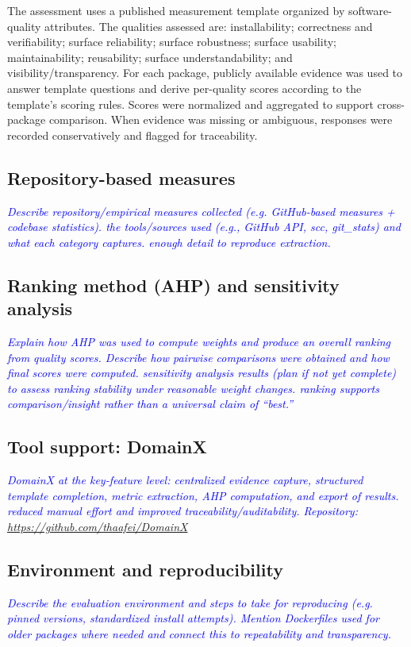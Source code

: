\documentclass[final,1p,times,authoryear,12pt]{elsarticle}
\providecommand{\wss}[1]{\textcolor{blue}{\textit{#1}}}
\begin{document}
The assessment uses a published measurement template organized by software-quality attributes. 
The qualities assessed are: installability; correctness and verifiability; surface reliability; surface robustness; surface usability;
 maintainability; reusability; surface understandability; and visibility/transparency. 
 For each package, publicly available evidence was used to answer template questions and derive per-quality scores according 
 to the template’s scoring rules. Scores were normalized and aggregated to support cross-package comparison.
  When evidence was missing or ambiguous, responses were recorded conservatively and flagged for traceability.

\subsection{Repository-based measures}\label{metrics}
\wss{Describe repository/empirical measures collected (e.g. GitHub-based measures + codebase statistics). 
 the tools/sources used (e.g., GitHub API, scc, git\_stats) and what each category captures. 
  enough detail to reproduce extraction.}

\subsection{Ranking method (AHP) and sensitivity analysis}\label{ahp}
\wss{Explain how AHP was used to compute weights and produce an overall ranking from quality scores. 
Describe how pairwise comparisons were obtained and how final scores were computed. 
 sensitivity analysis results (plan if not yet complete) to assess ranking stability under reasonable weight changes. 
 ranking supports comparison/insight rather than a universal claim of “best.”}

\subsection{Tool support: DomainX}\label{domainx}
\wss{ DomainX at the key-feature level: centralized evidence capture, structured template completion, 
metric extraction, AHP computation, and export of results.  reduced manual effort and improved traceability/auditability. 
Repository: \url{https://github.com/thaafei/DomainX} }


\subsection{Environment and reproducibility}\label{env}
\wss{Describe the evaluation environment and  steps to take for reproducing (e.g. pinned versions, standardized install attempts). 
Mention Dockerfiles used for older packages where needed and connect this to repeatability and transparency.}
\end{document}
